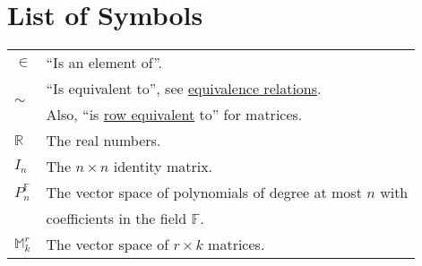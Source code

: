 
\chapter{List of Symbols}

\begin{center}
\begin{tabular}{ll}
$\in $ & ``Is an element of''.\\[2mm]
\multirow{2}{*}{$\sim$} & ``Is equivalent to'', see \hyperlink{equivalence}{equivalence relations}.\\
&Also, ``is \hyperlink{roweq}{row equivalent} to'' for matrices.\\[2mm]
${\mathbb R}$ & The real numbers.\\[2mm]
$I_n$ & The $n \times n$ identity matrix.\\[2mm]
$P_n^{\mathbb{F}}$ & The vector space of polynomials of degree at most $n$ with \\
 & coefficients in the field $\mathbb{F}$.\\[2mm]
${\mathbb M}_k^r$ & The vector space of $r\times k$ matrices.
\end{tabular}
\end{center}

\newpage
